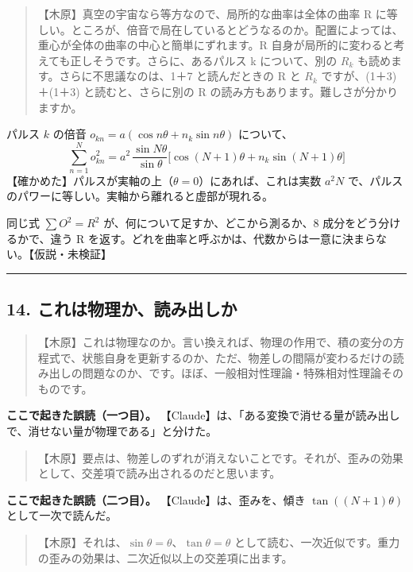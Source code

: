 \documentclass[
  a4paper,
]{ltjsarticle}
\begin{document}
\begin{quote}
【木原】真空の宇宙なら等方なので、局所的な曲率は全体の曲率 R
に等しい。ところが、倍音で局在しているとどうなるのか。配置によっては、重心が全体の曲率の中心と簡単にずれます。R
自身が局所的に変わると考えても正しそうです。さらに、あるパルス k
について、別の \(R_k\) も読めます。さらに不思議なのは、1＋7
と読んだときの R と \(R_k\) ですが、(1＋3)＋(1＋3) と読むと、さらに別の
R の読み方もあります。難しさが分かりますか。
\end{quote}

パルス \(k\) の倍音 \(o_{kn} = a(\cos n\theta + n_k\sin n\theta)\)
について、 \[
\sum_{n=1}^N o_{kn}^2 = a^2\,\frac{\sin N\theta}{\sin\theta}\big[\cos(N+1)\theta + n_k\sin(N+1)\theta\big] \tag{13.3}
\] 【確かめた】パルスが実軸の上（\(\theta = 0\)）にあれば、これは実数
\(a^2N\) で、パルスのパワーに等しい。実軸から離れると虚部が現れる。

同じ式 \(\sum O^2 = R^2\) が、何について足すか、どこから測るか、8
成分をどう分けるかで、違う R
を返す。どれを曲率と呼ぶかは、代数からは一意に決まらない。【仮説・未検証】

\begin{center}\rule{0.5\linewidth}{0.5pt}\end{center}

\subsection{14.
これは物理か、読み出しか}\label{ux3053ux308cux306fux7269ux7406ux304bux8aadux307fux51faux3057ux304b}

\begin{quote}
【木原】これは物理なのか。言い換えれば、物理の作用で、積の変分の方程式で、状態自身を更新するのか、ただ、物差しの間隔が変わるだけの読み出しの問題なのか、です。ほぼ、一般相対性理論・特殊相対性理論そのものです。
\end{quote}

\textbf{ここで起きた誤読（一つ目）。}
【Claude】は、「ある変換で消せる量が読み出しで、消せない量が物理である」と分けた。

\begin{quote}
【木原】要点は、物差しのずれが消えないことです。それが、歪みの効果として、交差項で読み出されるのだと思います。
\end{quote}

\textbf{ここで起きた誤読（二つ目）。} 【Claude】は、歪みを、傾き
\(\tan((N+1)\theta)\) として一次で読んだ。

\begin{quote}
【木原】それは、\(\sin\theta = \theta\)、\(\tan\theta = \theta\)
として読む、一次近似です。重力の歪みの効果は、二次近似以上の交差項に出ます。
\end{quote}
\end{document}
